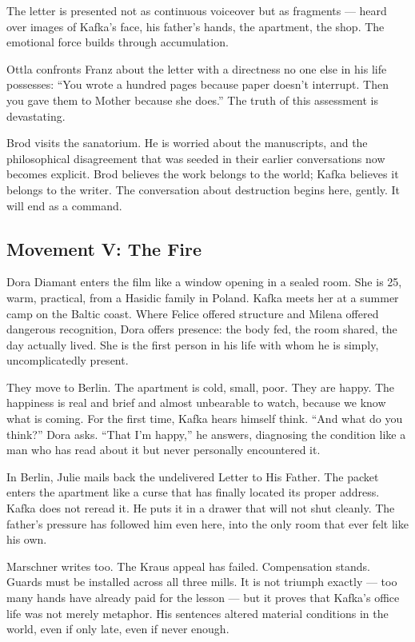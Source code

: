 The letter is presented not as continuous voiceover but as fragments --- heard over images of Kafka's face, his father's hands, the apartment, the shop. The emotional force builds through accumulation.

Ottla confronts Franz about the letter with a directness no one else in his life possesses: ``You wrote a hundred pages because paper doesn't interrupt. Then you gave them to Mother because she does.'' The truth of this assessment is devastating.

Brod visits the sanatorium. He is worried about the manuscripts, and the philosophical disagreement that was seeded in their earlier conversations now becomes explicit. Brod believes the work belongs to the world; Kafka believes it belongs to the writer. The conversation about destruction begins here, gently. It will end as a command.

\subsection{Movement V: The Fire}

Dora Diamant enters the film like a window opening in a sealed room. She is 25, warm, practical, from a Hasidic family in Poland. Kafka meets her at a summer camp on the Baltic coast. Where Felice offered structure and Milena offered dangerous recognition, Dora offers presence: the body fed, the room shared, the day actually lived. She is the first person in his life with whom he is simply, uncomplicatedly present.

They move to Berlin. The apartment is cold, small, poor. They are happy. The happiness is real and brief and almost unbearable to watch, because we know what is coming. For the first time, Kafka hears himself think. ``And what do you think?'' Dora asks. ``That I'm happy,'' he answers, diagnosing the condition like a man who has read about it but never personally encountered it.

In Berlin, Julie mails back the undelivered Letter to His Father. The packet enters the apartment like a curse that has finally located its proper address. Kafka does not reread it. He puts it in a drawer that will not shut cleanly. The father's pressure has followed him even here, into the only room that ever felt like his own.

Marschner writes too. The Kraus appeal has failed. Compensation stands. Guards must be installed across all three mills. It is not triumph exactly --- too many hands have already paid for the lesson --- but it proves that Kafka's office life was not merely metaphor. His sentences altered material conditions in the world, even if only late, even if never enough.

